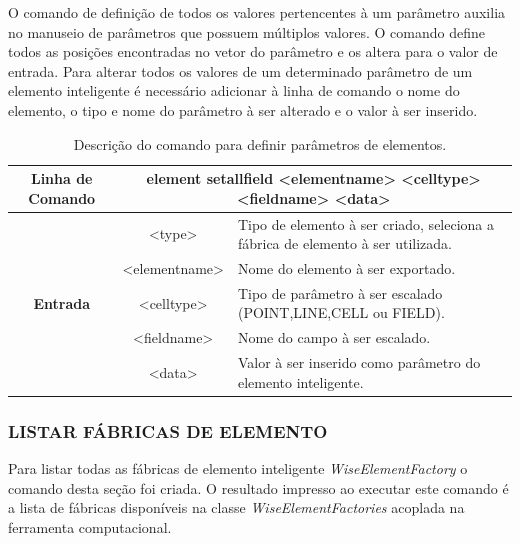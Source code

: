 \documentclass[a4paper,12pt]{monografia}
\theoremstyle{plain}
\theoremstyle{definition}
\theoremstyle{remark}
\begin{document}
O comando de definição de todos os valores pertencentes à um parâmetro auxilia no manuseio de parâmetros que possuem múltiplos valores. O comando define todos as posições encontradas no vetor do parâmetro e os altera para o valor de entrada. Para alterar todos os valores de um determinado parâmetro de um elemento inteligente é necessário adicionar à linha de comando o nome do elemento, o tipo e nome do parâmetro à ser alterado e o valor à ser inserido.

\begin{center}
	\begin{table}[!htbp]
		\begin{tabular}{|c|c|m{}|}
			\hline
			\textbf{Linha de Comando} & \multicolumn{2}{c|}{element set\underline{\space\space}all\underline{\space\space}field <element\underline{\space\space}name> <cell\underline{\space\space}type> <field\underline{\space\space}name> <data>} \\
			\hline
			\multirow{5}{*}{\textbf{Entrada}} & <type> & Tipo de elemento à ser criado, seleciona a fábrica de elemento à ser utilizada. \\
			
			& <element\underline{\space\space}name> & Nome do elemento à ser exportado. \\
			& <cell\underline{\space\space}type> & Tipo de parâmetro à ser escalado (POINT,LINE,CELL ou FIELD). \\
			& <field\underline{\space\space}name> & Nome do campo à ser escalado. \\
			& <data> & Valor à ser inserido como parâmetro do elemento inteligente. \\
			\hline
		\end{tabular}
		\caption{Descrição do comando para definir parâmetros de elementos.}
		\label{tab:set_all_field_element}
	\end{table}
\end{center}

\subsubsection{LISTAR FÁBRICAS DE ELEMENTO}\label{sec:list_element_factories}

Para listar todas as fábricas de elemento inteligente \textit{WiseElementFactory} o comando desta seção foi criada. O resultado impresso ao executar este comando é a lista de fábricas disponíveis na classe \textit{WiseElementFactories} acoplada na ferramenta computacional.
\end{document}
